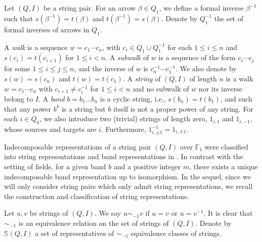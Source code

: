 \documentclass[12pt]{amsart}
\theoremstyle{remark}
\theoremstyle{definition}
\numberwithin{equation}{section}
\begin{document}
Let $(Q,I)$ be a string pair.
For an arrow $\beta\in Q_1$, we define a formal inverse $\beta^{-1}$ such that 
 $s(\beta^{-1})=t(\beta)$ and $t(\beta^{-1})=s(\beta)$. Denote by $Q_1^{-1}$ the set of formal inverses of arrows in $Q_1$.


A {\em walk} is a sequence $w=c_1\cdots c_n$, with $c_i\in Q_1\cup Q_1^{-1}$ for each $1\leq i\leq n$ and $s(c_i)=t(c_{i+1})$ for $1\leq i<n$. A {\em subwalk} of $w$ is a sequence of the form $c_i\cdots c_j$ for some $1\leq i\leq j\leq n$, and the inverse of $w$ is $c_n^{-1}\cdots c_{1}^{-1}$. We also denote by $s(w)=s(c_n)$ and $t(w)=t(c_1)$. A {\em string} of $(Q,I)$ of length $n$ is a walk $w=c_1\cdots c_n$ with $c_{i+1}\neq c_i^{-1}$ for $1\leq i<n$ and no subwalk of $w$ nor its inverse belong to $I$.
A {\em band} $b=b_1\dots b_n$ is a cyclic string, i.e., $s(b_n)=t(b_1)$, and such that any power $b^k$ is a string but $b$ itself is not a proper power of any string. For each $i\in Q_0$, we also introduce two (trivial) strings of length zero, $1_{i,1}$ and $1_{i,-1}$, whose sources and targets are $i$. Furthermore, $1_{i,\pm 1}^{-1}=1_{i,\mp 1}$.


Indecomposable representations of a string pair $(Q,I)$ over $\mathbb{F}_1$ were classified into string representations and band representations in \cite{TF25}. In contrast with the setting of fields, for a given band $b$ and a positive integer $m$, there exists a unique indecomposable band representation up to isomorphism.
In the sequel, since we will only consider string pairs which only admit string representations, we recall the construction and classification of string representations.






Let $u,v$ be strings of $(Q,I)$. We say $u\sim_{-1}v$ if $u=v$ or $u=v^{-1}$. It is clear that $\sim_{-1}$ is an equivalence relation on the set of strings of $(Q,I)$. Denote by $\mathbb{S}(Q,I)$ a set of representatives of $\sim_{-1}$ equivalence classes of strings.
\end{document}
